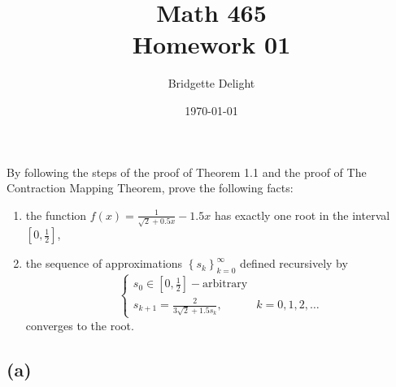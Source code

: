 \documentclass{article}
\title{{\large Math 465}\\ Homework 01}
\author{Bridgette Delight}
\date{\today}
\begin{document}
\maketitle

\section{}
By following the steps of the proof of Theorem 1.1 and the proof of The Contraction Mapping Theorem, prove the following facts:

\begin{enumerate}[label = (\alph*)]
    \item the function $f(x)= \frac{1}{\sqrt{2}+0.5x}-1.5x$ has exactly one root in the interval $\left[0, \frac{1}{2}  \right]$,
    \item the sequence of approximations $\left\{ s_k \right\}^{\infty}_{k=0}$ defined recursively by 
    \begin{equation}\label{cases}
    \begin{cases}
    s_0 \in \left[0, \frac{1}{2} \right] - \text{arbitrary}\\
    s_{k+1} = \frac{2}{3\sqrt{2}+1.5s_k}, &k=0,1,2,\dots
    \end{cases}
    \end{equation}converges to the root.
\end{enumerate}


\vspace{10mm}

\subsection*{(a)}
\end{document}
